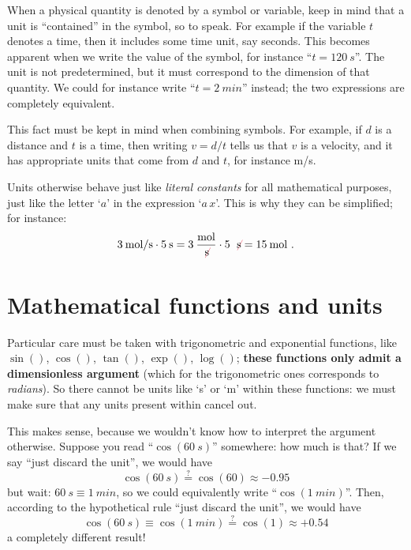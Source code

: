\documentclass[a4paper,12pt,%
onecolumn,oneside,%
british%
]{memoir}
\renewcommand*{\|}[1][]{\nonscript\:#1\vert\nonscript\:\mathopen{}}
\begin{document}
When a physical quantity is denoted by a symbol or variable, keep in mind that a unit is \enquote{contained} in the symbol, so to speak. For example if the variable $t$ denotes a time, then it includes some time unit, say seconds. This becomes apparent when we write the value of the symbol, for instance \enquote{$t=\qty{120}{s}$}. The unit is not predetermined, but it must correspond to the dimension of that quantity. We could for instance write \enquote{$t=\qty{2}{min}$} instead; the two expressions are completely equivalent.

This fact must be kept in mind when combining symbols. For example, if $d$ is a distance and $t$ is a time, then writing $v=d/t$ tells us that $v$ is a velocity, and it has appropriate units that come from $d$ and $t$, for instance \unit{m/s}.

Units otherwise behave just like \emph{literal constants} for all mathematical purposes, just like the letter \enquote*{$a$} in the expression \enquote*{$a\, x$}. This is why they can be simplified; for instance:
\begin{equation*}
  \qty{3}{mol/s} \cdot \qty{5}{s} =
  \num{3}\:\frac{\unit{mol}}{\mathcolor{red}{\not}\!\unit{s}} \cdot \num{5}\:\mathcolor{red}{\not}\!\unit{s} = \qty{15}{mol} \ .
\end{equation*}

\section{Mathematical functions and units}
\label{sec:functions_units}

Particular care must be taken with trigonometric and exponential functions, like $\sin()$, $\cos()$, $\tan()$, $\exp()$, $\log()$; \textbf{these functions only admit a dimensionless argument} (which for the trigonometric ones corresponds to \emph{radians}). So there cannot be units like \enquote*{\unit{s}} or \enquote*{\unit{m}} within these functions: we must make sure that any units present within cancel out.

This makes sense, because we wouldn't know how to interpret the argument otherwise. Suppose you read \enquote{$\cos(\qty{60}{s})$} somewhere: how much is that? If we say \enquote{just discard the unit}, we would have
\begin{equation*}
  \cos(\qty{60}{s}) \stackrel{?}{=} \cos(60) \approx -0.95
\end{equation*}
but wait: $\qty{60}{s}\equiv\qty{1}{min}$, so we could equivalently write \enquote{$\cos(\qty{1}{min})$}. Then, according to the hypothetical rule \enquote{just discard the unit}, we would have
\begin{equation*}
  \cos(\qty{60}{s}) \equiv \cos(\qty{1}{min})\stackrel{?}{=} \cos(1) \approx +0.54
\end{equation*}
a completely different result!
\end{document}

